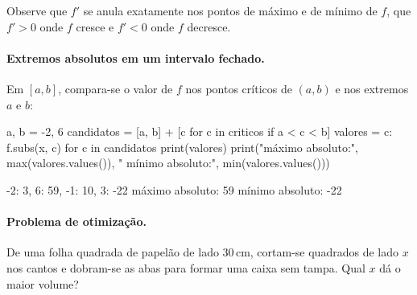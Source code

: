 Observe que $f'$ se anula exatamente nos pontos de máximo e de mínimo de $f$, que $f'>0$ onde $f$ cresce e
$f'<0$ onde $f$ decresce.

\paragraph{Extremos absolutos em um intervalo fechado.} Em $[a,b]$, compara-se o valor de $f$ nos pontos críticos
de $(a,b)$ e nos extremos $a$ e $b$:

\begin{entrada}
a, b = -2, 6
candidatos = [a, b] + [c for c in criticos if a < c < b]
valores = {c: f.subs(x, c) for c in candidatos}
print(valores)
print("máximo absoluto:", max(valores.values()), "  mínimo absoluto:", min(valores.values()))
\end{entrada}
\begin{saida}
{-2: 3, 6: 59, -1: 10, 3: -22}
máximo absoluto: 59   mínimo absoluto: -22
\end{saida}

\paragraph{Problema de otimização.} De uma folha quadrada de papelão de lado 30\,cm, cortam-se quadrados de lado
$x$ nos cantos e dobram-se as abas para formar uma caixa sem tampa. Qual $x$ dá o maior volume?

\begin{figure}[ht]
\centering
{}
\end{figure}

